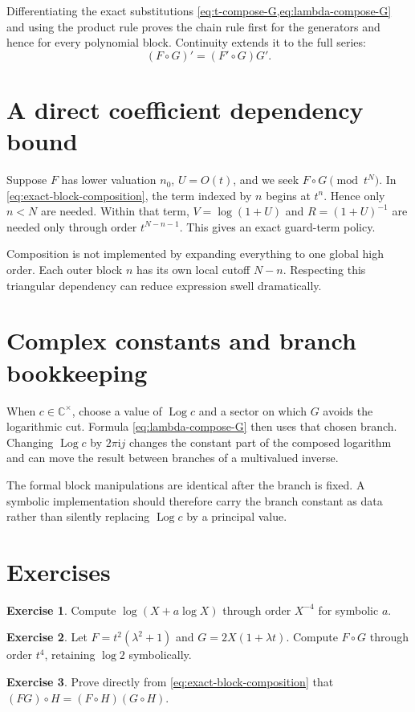 \documentclass[11pt,openany]{book}
\theoremstyle{definition}
\newtheorem{exercise}{Exercise}[chapter]
\theoremstyle{plain}
\theoremstyle{remark}
\newcommand{\C}{\mathbb{C}}
\newcommand{\ii}{\mathrm{i}}
\DeclareMathOperator{\Log}{Log}
\begin{document}
Differentiating the exact substitutions \cref{eq:t-compose-G,eq:lambda-compose-G} and using the product rule proves the chain rule first for the generators and hence for every polynomial block. Continuity extends it to the full series:
\begin{equation}\label{eq:chain-rule}
 (F\circ G)'=(F'\circ G)G'.
\end{equation}

\section{A direct coefficient dependency bound}
Suppose \(F\) has lower valuation \(n_0\), \(U=O(t)\), and we seek \(F\circ G\pmod{t^N}\). In \cref{eq:exact-block-composition}, the term indexed by \(n\) begins at \(t^n\). Hence only \(n<N\) are needed. Within that term, \(V=\log(1+U)\) and \(R=(1+U)^{-1}\) are needed only through order \(t^{N-n-1}\). This gives an exact guard-term policy.

\begin{algorithmicbox}
Composition is not implemented by expanding everything to one global high order. Each outer block \(n\) has its own local cutoff \(N-n\). Respecting this triangular dependency can reduce expression swell dramatically.
\end{algorithmicbox}

\section{Complex constants and branch bookkeeping}
When \(c\in\C^\times\), choose a value of \(\Log c\) and a sector on which \(G\) avoids the logarithmic cut. Formula \cref{eq:lambda-compose-G} then uses that chosen branch. Changing \(\Log c\) by \(2\pi\ii j\) changes the constant part of the composed logarithm and can move the result between branches of a multivalued inverse.

The formal block manipulations are identical after the branch is fixed. A symbolic implementation should therefore carry the branch constant as data rather than silently replacing \(\Log c\) by a principal value.

\section{Exercises}
\begin{exercise}
Compute \(\log(X+a\log X)\) through order \(X^{-4}\) for symbolic \(a\).
\end{exercise}
\begin{exercise}
Let \(F=t^2(\lambda^2+1)\) and \(G=2X(1+\lambda t)\). Compute \(F\circ G\) through order \(t^4\), retaining \(\log2\) symbolically.
\end{exercise}
\begin{exercise}
Prove directly from \cref{eq:exact-block-composition} that \((FG)\circ H=(F\circ H)(G\circ H)\).
\end{exercise}
\end{document}
